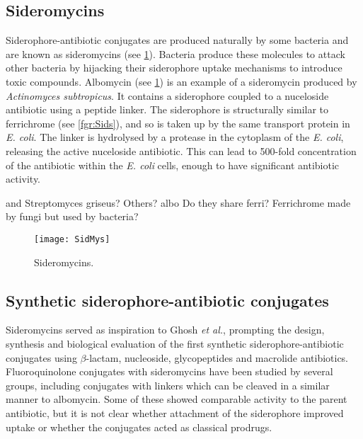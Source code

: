 \subsection{Sideromycins}


Siderophore-antibiotic conjugates are produced naturally by some bacteria and are known as sideromycins\cite{Page2013} (see \ref{fgr:SidMys}). Bacteria produce these molecules to attack other bacteria by hijacking their siderophore uptake mechanisms to introduce toxic compounds. Albomycin  (see \ref{fgr:SidMys}) is an example of a sideromycin produced by \textit{Actinomyces subtropicus}\cite{Hartmann1979}. It contains a siderophore coupled to a nuceloside antibiotic using a peptide linker. The siderophore is structurally similar to ferrichrome  (see \ref{fgr:Sids}), and so is taken up by the same transport protein in \textit{E. coli}. The linker is hydrolysed by a protease in the cytoplasm of the \textit{E. coli}, releasing the active nuceloside antibiotic. This can lead to 500-fold concentration of the antibiotic within the \textit{E. coli} cells, enough to have significant antibiotic activity.

and Streptomyces griseus? Others? albo
Do they share ferri?
Ferrichrome made by fungi but used by bacteria?

\begin{figure}[H]
	\begin{center}
		\texttt{[image: SidMys]}
		\caption{Sideromycins. \label{fgr:SidMys}}
	\end{center}
\end{figure}

\subsection{Synthetic siderophore-antibiotic conjugates}

Sideromycins served as inspiration to Ghosh \textit{et al.}\cite{Ghosh1995}, prompting the design, synthesis and biological evaluation of the first synthetic siderophore-antibiotic conjugates using $\beta$-lactam\cite{Mollmann2009,Dini2000,Kline2000}, nucleoside\cite{Lu1999}, glycopeptides\cite{Ghosh1996} and macrolide\cite{Ghosh1995} antibiotics. Fluoroquinolone  conjugates with sideromycins have been studied by several groups\cite{Md-Saleh2009,Rivault2007,Ji2012}, including conjugates with linkers which can be cleaved\cite{Rivault2007,Ji2012} in a similar manner to albomycin\cite{Hartmann1979}. Some of these showed comparable activity to the parent antibiotic, but it is not clear whether attachment of the siderophore improved uptake or whether the conjugates acted as classical prodrugs.

